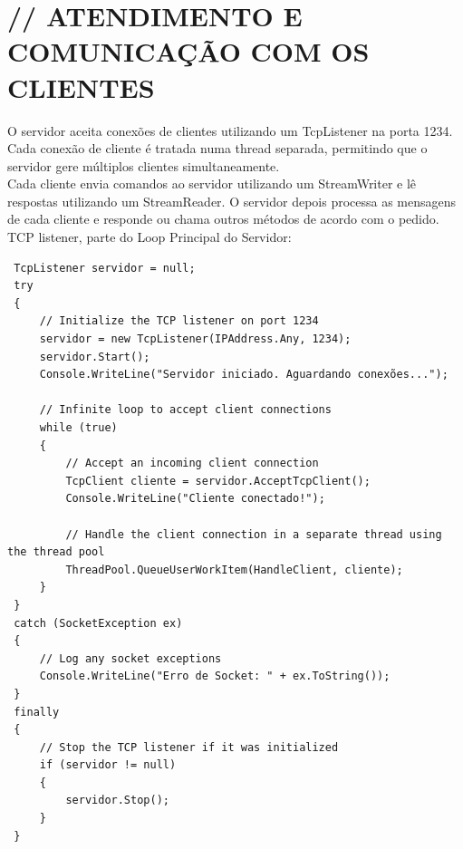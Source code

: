 \documentclass[12pt]{article}
\begin{document}
\section{// ATENDIMENTO E COMUNICAÇÃO COM OS CLIENTES}

O servidor aceita conexões de clientes utilizando um TcpListener na porta 1234. Cada conexão de cliente é tratada numa thread separada, permitindo que o servidor gere múltiplos clientes simultaneamente.\\

\noindent Cada cliente envia comandos ao servidor utilizando um StreamWriter e lê respostas utilizando um StreamReader. O servidor depois processa as mensagens de cada cliente e responde ou chama outros métodos de acordo com o pedido.\\

TCP listener, parte do Loop Principal do Servidor:
\begin{verbatim}
 TcpListener servidor = null;
 try
 {
     // Initialize the TCP listener on port 1234
     servidor = new TcpListener(IPAddress.Any, 1234);
     servidor.Start();
     Console.WriteLine("Servidor iniciado. Aguardando conexões...");

     // Infinite loop to accept client connections
     while (true)
     {
         // Accept an incoming client connection
         TcpClient cliente = servidor.AcceptTcpClient();
         Console.WriteLine("Cliente conectado!");

         // Handle the client connection in a separate thread using the thread pool
         ThreadPool.QueueUserWorkItem(HandleClient, cliente);
     }
 }
 catch (SocketException ex)
 {
     // Log any socket exceptions
     Console.WriteLine("Erro de Socket: " + ex.ToString());
 }
 finally
 {
     // Stop the TCP listener if it was initialized
     if (servidor != null)
     {
         servidor.Stop();
     }
 }
\end{verbatim}
\end{document}
